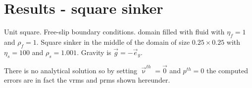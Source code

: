 \newpage
\section*{Results - square sinker}

Unit square. Free-slip boundary conditions. domain filled with fluid with $\eta_f=1$ and $\rho_f=1$.
Square sinker in the middle of the domain of size $0.25\times 0.25$ with $\eta_s=100$ and
$\rho_s=1.001$. Gravity is $\vec{g}=-\vec{e}_y$. 

There is no analytical solution so by setting $\vec{\upnu}^{th}=\vec{0}$ and 
$p^{th}=0$ the computed errors are in fact the vrms and prms shown hereunder.






